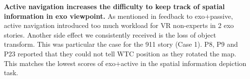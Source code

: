 \textbf{Active navigation increases the difficulty to keep track of spatial information in exo viewpoint.} As mentioned in feedback to exo$+$passive, active navigation introduced too much workload for VR non-experts in 2 exo stories. Another side effect we consistently received is the loss of object transform. This was particular the case for the 911 story (Case 1). P8, P9 and P23 reported that they could not tell WTC position as they rotated the map. This matches the lowest scores of exo$+$active in the spatial information depiction task.